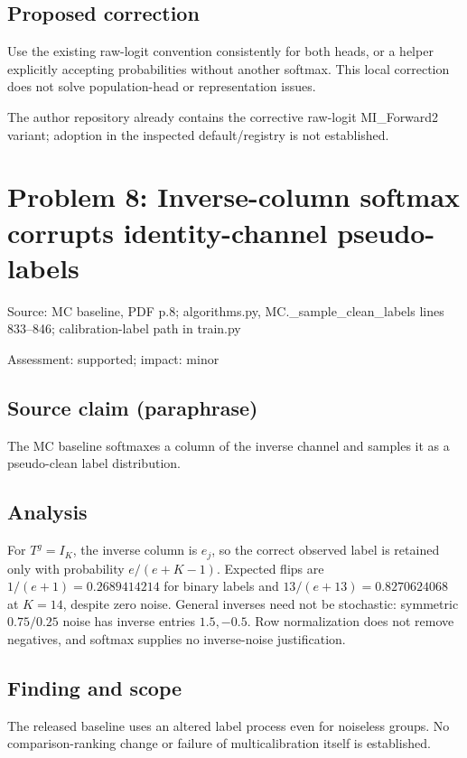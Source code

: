 \documentclass[11pt]{article}
\begin{document}
\subsection*{Proposed correction}

Use the existing raw-logit convention consistently for both heads, or a helper explicitly accepting probabilities without another softmax. This local correction does not solve population-head or representation issues.

The author repository already contains the corrective raw-logit MI\_Forward2 variant; adoption in the inspected default/registry is not established.

\section*{Problem 8: Inverse-column softmax corrupts identity-channel pseudo-labels}

Source: MC baseline, PDF p.8; algorithms.py, MC.\_sample\_clean\_labels lines 833–846; calibration-label path in train.py

Assessment: supported; impact: minor

\subsection*{Source claim (paraphrase)}

The MC baseline softmaxes a column of the inverse channel and samples it as a pseudo-clean label distribution.

\subsection*{Analysis}

For \(T^g=I_K\), the inverse column is \(e_j\), so the correct observed label is retained only with probability \(e/(e+K-1)\). Expected flips are \(1/(e+1)=0.2689414214\) for binary labels and \(13/(e+13)=0.8270624068\) at \(K=14\), despite zero noise. General inverses need not be stochastic: symmetric \(0.75/0.25\) noise has inverse entries \(1.5,-0.5\). Row normalization does not remove negatives, and softmax supplies no inverse-noise justification.

\subsection*{Finding and scope}

The released baseline uses an altered label process even for noiseless groups. No comparison-ranking change or failure of multicalibration itself is established.
\end{document}

